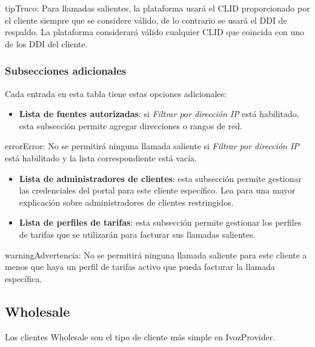 \documentclass[letterpaper,10pt,spanish]{sphinxmanual}
\begin{document}
\begin{notice}{tip}{Truco:}
Para llamadas salientes, la plataforma usará el CLID proporcionado por el cliente siempre que se considere válido, de lo contrario se usará el DDI de respaldo. La plataforma considerará válido cualquier CLID que coincida con uno de los DDI del cliente.
\end{notice}


\subsubsection{Subsecciones adicionales}
\label{administration_portal/brand/clients/retail:additional-subsections}
Cada entrada en esta tabla tiene estas opciones adicionales:
\begin{itemize}
\item {} 
\textbf{Lista de fuentes autorizadas}: si \emph{Filtrar por dirección IP} está habilitado, esta subsección permite agregar direcciones o rangos de red.

\end{itemize}

\begin{notice}{error}{Error:}
No se permitirá ninguna llamada saliente si \emph{Filtrar por dirección IP} está habilitado y la lista correspondiente está vacía.
\end{notice}
\begin{itemize}
\item {} 
\textbf{Lista de administradores de clientes}: esta subsección permite gestionar las credenciales del portal para este cliente específico. Lea {\hyperref[api_rest/acls:acls]{}} para una mayor explicación sobre administradores de clientes restringidos.

\item {} 
\textbf{Lista de perfiles de tarifas}: esta subsección permite gestionar los perfiles de tarifas que se utilizarán para facturar sus llamadas salientes.

\end{itemize}

\begin{notice}{warning}{Advertencia:}
No se permitirá ninguna llamada saliente para este cliente a menos que haya un perfil de tarifas activo que pueda facturar la llamada específica.
\end{notice}


\subsection{Wholesale}
\label{administration_portal/brand/clients/wholesale:wholesale}\label{administration_portal/brand/clients/wholesale:wholesale-clients}\label{administration_portal/brand/clients/wholesale::doc}
Los clientes Wholesale son el tipo de cliente más simple en IvozProvider.
\end{document}
